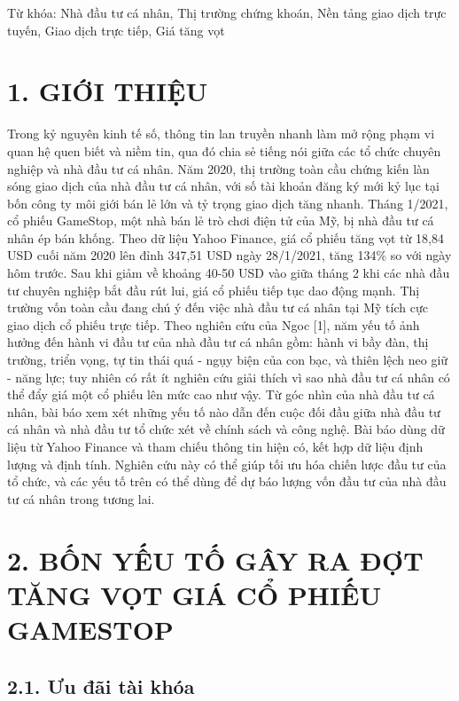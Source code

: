 Từ khóa: Nhà đầu tư cá nhân, Thị trường chứng khoán, Nền tảng giao dịch trực tuyến, Giao dịch trực tiếp, Giá tăng vọt

\section{1. GIỚI THIỆU}

Trong kỷ nguyên kinh tế số, thông tin lan truyền nhanh làm mở rộng phạm vi quan hệ quen biết và niềm tin, qua đó chia sẻ tiếng nói giữa các tổ chức chuyên nghiệp và nhà đầu tư cá nhân. Năm 2020, thị trường toàn cầu chứng kiến làn sóng giao dịch của nhà đầu tư cá nhân, với số tài khoản đăng ký mới kỷ lục tại bốn công ty môi giới bán lẻ lớn và tỷ trọng giao dịch tăng nhanh. Tháng 1/2021, cổ phiếu GameStop, một nhà bán lẻ trò chơi điện tử của Mỹ, bị nhà đầu tư cá nhân ép bán khống. Theo dữ liệu Yahoo Finance, giá cổ phiếu tăng vọt từ 18,84 USD cuối năm 2020 lên đỉnh 347,51 USD ngày 28/1/2021, tăng 134\% so với ngày hôm trước. Sau khi giảm về khoảng 40-50 USD vào giữa tháng 2 khi các nhà đầu tư chuyên nghiệp bắt đầu rút lui, giá cổ phiếu tiếp tục dao động mạnh. Thị trường vốn toàn cầu đang chú ý đến việc nhà đầu tư cá nhân tại Mỹ tích cực giao dịch cổ phiếu trực tiếp. Theo nghiên cứu của Ngoc {[}1{]}, năm yếu tố ảnh hưởng đến hành vi đầu tư của nhà đầu tư cá nhân gồm: hành vi bầy đàn, thị trường, triển vọng, tự tin thái quá - ngụy biện của con bạc, và thiên lệch neo giữ - năng lực; tuy nhiên có rất ít nghiên cứu giải thích vì sao nhà đầu tư cá nhân có thể đẩy giá một cổ phiếu lên mức cao như vậy. Từ góc nhìn của nhà đầu tư cá nhân, bài báo xem xét những yếu tố nào dẫn đến cuộc đối đầu giữa nhà đầu tư cá nhân và nhà đầu tư tổ chức xét về chính sách và công nghệ. Bài báo dùng dữ liệu từ Yahoo Finance và tham chiếu thông tin hiện có, kết hợp dữ liệu định lượng và định tính. Nghiên cứu này có thể giúp tối ưu hóa chiến lược đầu tư của tổ chức, và các yếu tố trên có thể dùng để dự báo lượng vốn đầu tư của nhà đầu tư cá nhân trong tương lai.

\section{2. BỐN YẾU TỐ GÂY RA ĐỢT TĂNG VỌT GIÁ CỔ PHIẾU GAMESTOP}

\subsection{2.1. Ưu đãi tài khóa}

